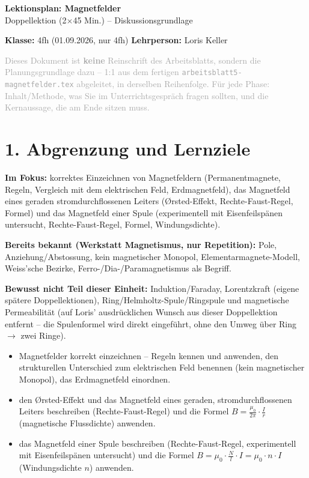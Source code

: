 \documentclass[11pt,a4paper]{article}
\begin{document}
\sloppy

\begin{center}
{\Huge\bfseries\color{titleblue}Lektionsplan: Magnetfelder}\\[0.4em]
{\large Doppellektion (2$\times$45 Min.) -- Diskussionsgrundlage}
\end{center}
\vspace{0.5em}

\noindent\textbf{Klasse:} 4fh (01.09.2026, nur 4fh) \hfill \textbf{Lehrperson:} Loris Keller

\vspace{0.3em}
\noindent\textcolor{darkgray}{Dieses Dokument ist \textbf{keine} Reinschrift des Arbeitsblatts, sondern
die Planungsgrundlage dazu -- 1:1 aus dem fertigen
\texttt{arbeitsblatt5-magnetfelder.tex} abgeleitet, in derselben
Reihenfolge. Für jede Phase: Inhalt/Methode, was Sie im
Unterrichtsgespräch fragen sollten, und die Kernaussage, die am Ende
sitzen muss.}

\section*{1. Abgrenzung und Lernziele}

\textbf{Im Fokus:} korrektes Einzeichnen von Magnetfeldern
(Permanentmagnete, Regeln, Vergleich mit dem elektrischen Feld,
Erdmagnetfeld), das Magnetfeld eines geraden stromdurchflossenen Leiters
(Ørsted-Effekt, Rechte-Faust-Regel, Formel) und das Magnetfeld einer Spule
(experimentell mit Eisenfeilspänen untersucht, Rechte-Faust-Regel, Formel,
Windungsdichte).

\textbf{Bereits bekannt (Werkstatt Magnetismus, nur Repetition):} Pole,
Anziehung/Abstossung, kein magnetischer Monopol, Elementarmagnete-Modell,
Weiss'sche Bezirke, Ferro-/Dia-/Paramagnetismus als Begriff.

\textbf{Bewusst nicht Teil dieser Einheit:} Induktion/Faraday, Lorentzkraft
(eigene spätere Doppellektionen), Ring/Helmholtz-Spule/Ringspule und
magnetische Permeabilität (auf Loris' ausdrücklichen Wunsch aus dieser
Doppellektion entfernt -- die Spulenformel wird direkt eingeführt, ohne den
Umweg über Ring $\to$ zwei Ringe).

\begin{itemize}[leftmargin=1.3cm,itemsep=0.3em]
  \item[LZ1] Magnetfelder korrekt einzeichnen -- Regeln kennen und
  anwenden, den strukturellen Unterschied zum elektrischen Feld benennen
  (kein magnetischer Monopol), das Erdmagnetfeld einordnen.
  \item[LZ2] den Ørsted-Effekt und das Magnetfeld eines geraden,
  stromdurchflossenen Leiters beschreiben (Rechte-Faust-Regel) und die
  Formel $B=\frac{\mu_0}{2\pi}\cdot\frac{I}{r}$ (magnetische Flussdichte)
  anwenden.
  \item[LZ3] das Magnetfeld einer Spule beschreiben (Rechte-Faust-Regel,
  experimentell mit Eisenfeilspänen untersucht) und die Formel
  $B=\mu_0\cdot\frac{N}{l}\cdot I=\mu_0\cdot n\cdot I$ (Windungsdichte $n$)
  anwenden.
\end{itemize}
\end{document}
